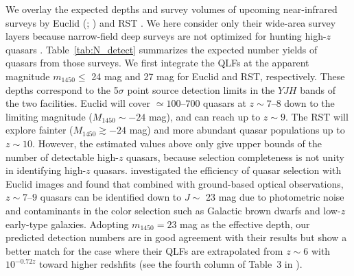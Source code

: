 \documentclass[twocolumn, twocolappendix]{aastex63}
\newcommand{\Muv}{M_{1450}}
\begin{document}
\begin{CJK*}{UTF8}{gbsn}
We overlay the expected depths and survey volumes of upcoming near-infrared surveys by
Euclid (\citealt{2011arXiv1110.3193L}; \citealt{2019Barnett}) and RST \citep{2019arXiv190205569A}.
We here consider only their wide-area survey layers because narrow-field deep surveys are not optimized for hunting high-$z$ quasars \citep[but see][]{2022arXiv220907325O}.
Table~\ref{tab:N_detect} summarizes the expected number yields of quasars from those surveys.
We first integrate the QLFs at the apparent magnitude $m_{1450}\leq$ 24 mag and 27 mag for Euclid and RST, respectively.
These depths correspond to the 5$\sigma$ point source detection limits in the $YJH$ bands of the two facilities.
Euclid will cover $\simeq 100$--$700$ quasars at $z\sim 7$--$8$ down to the limiting magnitude ($\Muv \sim -24$ mag),
and can reach up to $z\sim 9$.
The RST will explore fainter ($\Muv \gtrsim -24$ mag) and more abundant quasar populations up to $z\sim 10$.
However, the estimated values above only give upper bounds of the number of detectable high-$z$ quasars,
because selection completeness is not unity in identifying high-$z$ quasars.
\citet{2019Barnett} investigated the efficiency of quasar selection with Euclid images
and found that combined with ground-based optical observations,
$z\sim 7$--$9$ quasars can be identified down to $J \sim$ 23 mag
due to photometric noise and contaminants in the color selection such as Galactic brown dwarfs and low-$z$ early-type galaxies.
Adopting $m_{1450}=23$ mag as the effective depth, %
our predicted detection numbers are in good agreement with their results but show a better match for the case
where their QLFs are extrapolated from $z\sim 6$ with $10^{-0.72z}$ toward higher redshfits
(see the fourth column of Table~3 in \citealt{2019Barnett}).


\end{CJK*}
\end{document}

